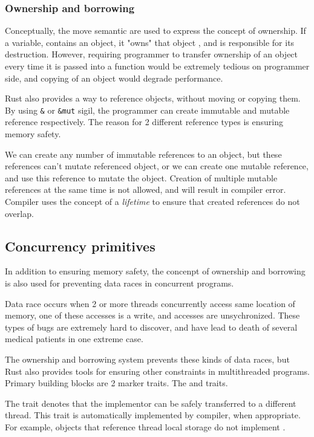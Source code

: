 \subsubsection{Ownership and borrowing}
Conceptually, the move semantic are used to express the concept of ownership. If a variable, contains an object, it "owns"
that object , and is responsible for its destruction. However, requiring programmer to transfer ownership of an object every time
it is passed into a function would be extremely tedious on programmer side, and copying of an object would degrade performance.

Rust also provides a way to reference objects, without moving or copying them. By using \verb|&| or
\verb|&mut| sigil, the programmer can create immutable and mutable reference respectively. The reason for 2 different
reference types is ensuring memory safety.

We can create any number of immutable references to an object, but these references can't mutate referenced object, or
we can create one mutable reference, and use this reference to mutate the object. Creation of multiple mutable references
at the same time is not allowed, and will result in compiler error. Compiler uses the concept of a \textit{lifetime} to ensure that created
references do not overlap.

\subsection{Concurrency primitives}
In addition to ensuring memory safety, the concenpt of ownership and borrowing is also used for preventing data 
races in concurrent programs. 

Data race occurs when 2 or more threads concurrently access same location of memory, one of these accesses is a write,
and accesses are unsychronized. These types of bugs are extremely hard to discover, and have lead to death of several medical patients in
one extreme case\cite{article:therac}.

The ownership and borrowing system prevents these kinds of data races, but Rust also provides tools for ensuring other
constraints in multithreaded programs. Primary building blocks are 2 marker traits. The  and  traits.

The  trait denotes that the implementor can be safely transferred to a different thread. This trait is automatically
implemented by compiler, when appropriate. For example, objects that reference thread local storage do not implement .

